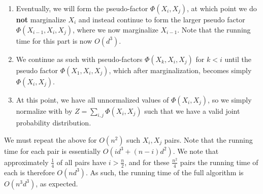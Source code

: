 \documentclass[12pt]{article}
\begin{document}
\begin{enumerate}[label=(\alph*)]
\begin{enumerate}
  	\item Eventually, we will form the pseudo-factor $\Phi(X_i,X_j)$, at which point we do \textbf{not} marginalize $X_i$ and instead continue to form the larger pseudo factor $\Phi(X_{i-1}, X_i, X_j)$, where we now marginalize $X_{i-1}$. Note that the running time for this part is now $O(d^3)$. 
  	\item We continue as such with pseudo-factors $\Phi(X_k, X_i, X_j)$ for $k < i$ until the pseudo factor $\Phi(X_1, X_i, X_j)$, which after marginalization, becomes simply $\Phi(X_i, X_j)$.
  	\item At this point, we have all unnormalized values of $\Phi(X_i, X_j)$, so we simply normalize with by $Z = \sum_{i,j} \Phi(X_i, X_j)$ such that we have a valid joint probability distribution.
  \end{enumerate}
  We must repeat the above for $O(n^2)$ such $X_i,X_j$ pairs. Note that the running time for each pair is essentially $O(id^3 + (n-i)d^2)$. We note that approximately $\frac{1}{4}$ of all pairs have $i > \frac{n}{2}$, and for these $\frac{n^2}{4}$ pairs the running time of each is therefore $O(nd^3)$. As such, the running time of the full algorithm is $O(n^3d^3)$, as expected.


\end{enumerate}
\end{document}
